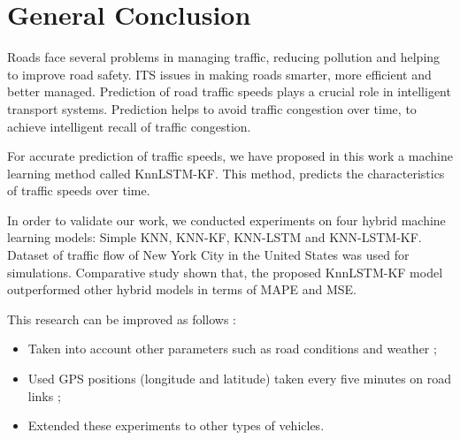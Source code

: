 \chapter*{General Conclusion}

Roads face several problems in managing traffic, reducing pollution and helping to improve road safety. ITS issues in making roads smarter, more efficient and better managed. Prediction of road traffic speeds plays a crucial role in intelligent transport systems. Prediction helps to avoid traffic congestion over time, to achieve intelligent recall of traffic congestion.

For accurate prediction of traffic speeds, we have proposed in this work a machine learning method called KnnLSTM-KF. This method, predicts the characteristics of traffic speeds over time. 

In order to validate our work, we conducted experiments on four hybrid machine learning models: Simple KNN, KNN-KF, KNN-LSTM and KNN-LSTM-KF. Dataset of traffic flow of New York City in the United States was used for simulations. Comparative study shown that, the proposed KnnLSTM-KF model outperformed other hybrid models in terms of MAPE and MSE.


This research can be improved as follows : 

\begin{itemize}
	
	\item Taken into account other parameters such as road conditions and weather ;
	
	\item Used GPS positions (longitude and latitude) taken every five minutes on road links ;
	
	\item Extended these experiments to other types of vehicles.

	
\end{itemize}






